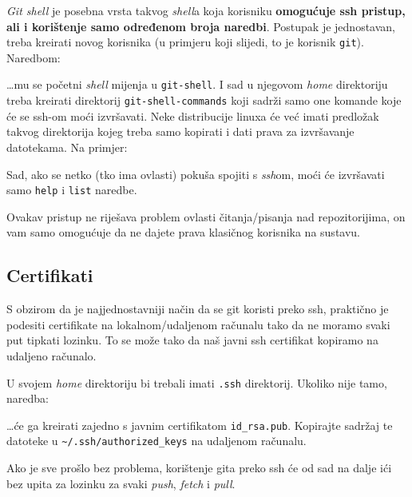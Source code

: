 \emph{Git shell} je posebna vrsta takvog \emph{shell}a koja korisniku \textbf{omogućuje ssh pristup, ali i korištenje samo određenom broja naredbi}.
Postupak je jednostavan, treba kreirati novog korisnika (u primjeru koji slijedi, to je korisnik \verb+git+).
Naredbom:


\dots{}mu se početni \emph{shell} mijenja u \verb+git-shell+.
I sad u njegovom \emph{home} direktoriju treba kreirati direktorij \verb+git-shell-commands+ koji sadrži samo one komande koje će se ssh-om moći izvršavati.
Neke distribucije linuxa će već imati predložak takvog direktorija kojeg treba samo kopirati i dati prava za izvršavanje datotekama.
Na primjer:


Sad, ako se netko (tko ima ovlasti) pokuša spojiti s \emph{ssh}om, moći će izvršavati samo \verb+help+ i \verb+list+ naredbe.

Ovakav pristup ne riješava problem ovlasti čitanja/pisanja nad repozitorijima, on vam samo omogućuje da ne dajete prava klasičnog korisnika na sustavu.

\subsection*{Certifikati}

S obzirom da je najjednostavniji način da se git koristi preko ssh, praktično je podesiti certifikate na lokalnom/udaljenom računalu tako da ne moramo svaki put tipkati lozinku.
To se može tako da naš javni ssh certifikat kopiramo na udaljeno računalo.

U svojem \emph{home} direktoriju bi trebali imati \verb+.ssh+ direktorij.
Ukoliko nije tamo, naredba:


\dots{}će ga kreirati zajedno s javnim certifikatom \verb+id_rsa.pub+.
Kopirajte sadržaj te datoteke u \verb+~/.ssh/authorized_keys+ na udaljenom računalu.

Ako je sve prošlo bez problema, korištenje gita preko ssh će od sad na dalje ići bez upita za lozinku za svaki \emph{push}, \emph{fetch} i \emph{pull}.

